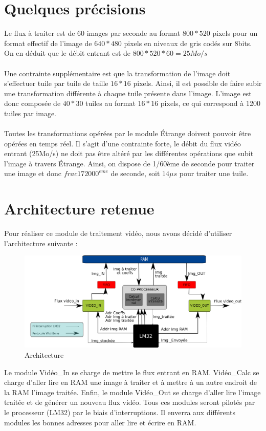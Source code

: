 \documentclass[a4paper,12pt]{report}
\begin{document}
{  \section{Quelques précisions}
  {
	 Le flux à traiter est de 60 images par seconde au format $800*520$ pixels pour un format effectif de l'image de $640*480$ pixels en niveaux de gris codés sur 8bits. On en déduit que le débit entrant est de $800*520*60 = 25 Mo/s$
		\\
		\\
		Une contrainte supplémentaire est que la transformation de l'image doit s'effectuer tuile par tuile de taille $16*16$ pixels. Ainsi, il est possible de faire subir une transformation différente à chaque tuile présente dans l'image. L'image est donc composée de $40*30$ tuiles au format $16*16$ pixels, ce qui correspond à 1200 tuiles par image.
		\\
		\\
		Toutes les transformations opérées par le module Étrange doivent pouvoir être opérées en temps réel. Il s'agit d'une contrainte forte, le débit du flux vidéo entrant (25Mo/s) ne doit pas être altéré par les différentes opérations que subit l'image à travers Étrange.
		Ainsi, on dispose de 1/60ème de seconde pour traiter une image et donc $frac{1}{72000}^{eme}$ de seconde, soit $14 \mu s$ pour traiter une tuile.

		\section{Architecture retenue}
	 {Pour réaliser ce module de traitement vidéo, nous avons décidé d'utiliser l'architecture suivante :

		\begin{figure}[!h]
		  \centering
		  \includegraphics[scale = 0.1]{hardware-arch.png}
		\caption{Architecture}
		\end{figure}

		Le module Vidéo\_In se charge de mettre le flux entrant en RAM. Vidéo\_Calc se charge d'aller lire en RAM une image à traiter et à mettre à un autre endroit de la RAM l'image traitée. Enfin, le module Vidéo\_Out se charge d'aller lire l'image traitée et de générer un nouveau flux vidéo. Tous ces modules seront pilotés par le processeur (LM32) par le biais d'interruptions. Il enverra aux différents modules les bonnes adresses pour aller lire et écrire en RAM.\\ \\

}}}
\end{document}
